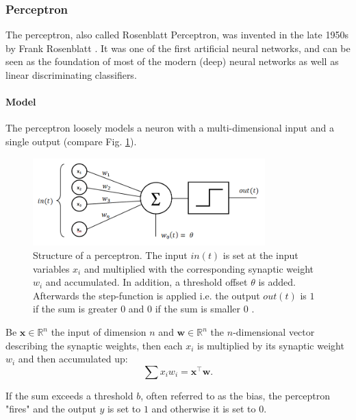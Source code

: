 \subsubsection{Perceptron} \label{c:perceptron}

The perceptron, also called Rosenblatt Perceptron, was invented in the late 1950s by Frank Rosenblatt \cite{rosenblatt1958perceptron}. 
It was one of the first artificial neural networks, and can be seen as the foundation of most of the modern (deep) neural networks as well as linear discriminating classifiers. 

\paragraph{Model} \label{c:permodel}

The perceptron loosely models a neuron with a multi-dimensional input and a single output (compare Fig. \ref{fig:perceptron}). 

\begin{figure}
	\centering
    	\includegraphics[width=0.8\textwidth]{imgs/percept.png} 
    \caption[Structure of a perceptron.]{Structure of a perceptron. The input $in(t)$ is set at the input variables $x_i$ and multiplied with the corresponding synaptic weight $w_i$ and accumulated. In addition, a threshold offset $\theta$ is added. Afterwards the step-function is applied i.e. the output $out(t)$ is $1$ if the sum is greater $0$ and $0$ if the sum is smaller $0$ \cite{perceptronImg}.}
	\label{fig:perceptron}
\end{figure}

Be $\textbf{x} \in \mathbb{R}^n$ the input of dimension $n$ and $\textbf{w}\in \mathbb{R}^n$ the $n$-dimensional vector describing the synaptic weights, then each $x_i$ is multiplied by its synaptic weight $w_i$ and then accumulated up:
\[
\sum x_i w_i = \textbf{x}^\intercal \textbf{w}.
\] 

If the sum exceeds a threshold $b$, often referred to as the bias, the perceptron "fires" and the output $y$ is set to $1$ and otherwise it is set to $0$.

